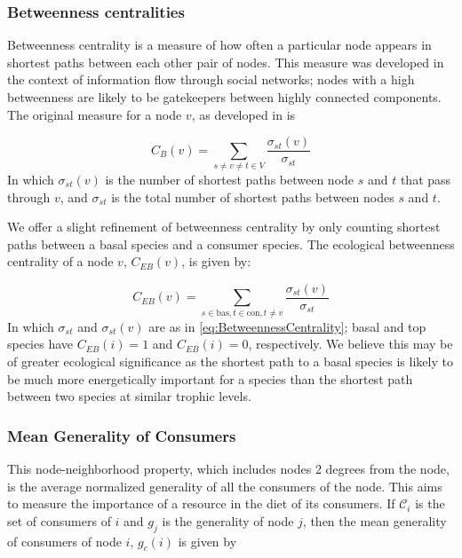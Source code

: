 \documentclass[/home/nkappler/Research/Dissertation/dissertation.tex]{subfiles}
\begin{document}
\begin{bibunit}
\subsubsection{Betweenness centralities} Betweenness centrality is a measure of
how often a particular node appears in shortest paths between each other pair
of nodes. This measure was developed in the context of information flow through
social networks; nodes with a high betweenness are likely to be gatekeepers
between highly connected components. The original measure for a node $v$, as developed in
\cite*{Freeman1977,Anthonisse1971} is

\begin{equation} 
    C_B(v) = \sum_{s\neq v\neq t\in V}\frac{\sigma_{st}(v)}{\sigma_{st}}
\label{eq:BetweennessCentrality} 
\end{equation}
%
In which $\sigma_{st}(v)$ is the number of shortest paths between node $s$ and $t$
that pass through $v$, and $\sigma_{st}$ is the total number of shortest paths
between nodes $s$ and $t$.

We offer a slight refinement of betweenness centrality by only counting
shortest paths between a basal species and a consumer species. The ecological
betweenness centrality of a node $v$, $C_{EB}(v)$, is given by:

\begin{equation} C_{EB}(v) = \sum_{s\in\text{bas},t\in\text{con},t\neq
v}\frac{\sigma_{st}(v)}{\sigma_{st}} \label{eq:EcologicalBetweennessCentrality}
\end{equation}
%
In which $\sigma_{st}$ and $\sigma_{st}(v)$ are as in
\ref{eq:BetweennessCentrality}; basal and top species have $C_{EB}(i)=1$ and
$C_{EB}(i) = 0$, respectively. We believe this may be of greater ecological
significance as the shortest path to a basal species is likely to be much more
energetically important for a species than the shortest path between two
species at similar trophic levels.

\subsubsection{Mean Generality of Consumers} This node-neighborhood property,
which includes nodes 2 degrees from the node, is the average normalized
generality of all the consumers of the node. This aims to measure the
importance of a resource in the diet of its consumers. If $\mathcal{C}_i$ is
the set of consumers of $i$ and $g_j$ is the generality of node $j$, then the
mean generality of consumers of node $i$, $g_c(i)$ is given by


\end{bibunit}
\end{document}
